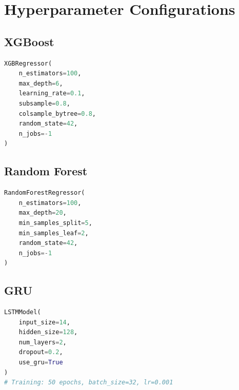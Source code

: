 \documentclass[11pt,a4paper]{article}
\begin{document}
\section{Hyperparameter Configurations}

\subsection{XGBoost}
\begin{lstlisting}[language=Python]
XGBRegressor(
    n_estimators=100,
    max_depth=6,
    learning_rate=0.1,
    subsample=0.8,
    colsample_bytree=0.8,
    random_state=42,
    n_jobs=-1
)
\end{lstlisting}

\subsection{Random Forest}
\begin{lstlisting}[language=Python]
RandomForestRegressor(
    n_estimators=100,
    max_depth=20,
    min_samples_split=5,
    min_samples_leaf=2,
    random_state=42,
    n_jobs=-1
)
\end{lstlisting}

\subsection{GRU}
\begin{lstlisting}[language=Python]
LSTMModel(
    input_size=14,
    hidden_size=128,
    num_layers=2,
    dropout=0.2,
    use_gru=True
)
# Training: 50 epochs, batch_size=32, lr=0.001
\end{lstlisting}
\end{document}
